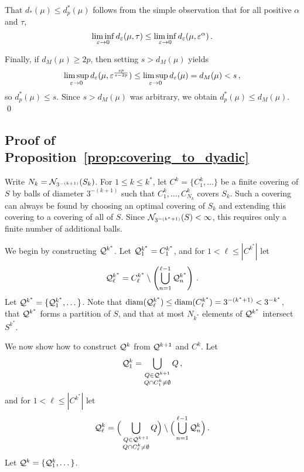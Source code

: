 That $d_*(\mu) \leq d^*_p(\mu)$ follows from the simple observation that for all positive $\alpha$ and $\tau$,
\begin{equation*}
\liminf_{\varepsilon \to 0} d_\varepsilon(\mu, \tau) \leq \liminf_{\varepsilon \to 0} d_\varepsilon(\mu, \varepsilon^{\alpha})\,.
\end{equation*}

Finally, if $d_M(\mu) \geq 2p$, then setting $s > d_M(\mu)$ yields
\begin{equation*}
\limsup_{\varepsilon \to 0} d_\varepsilon(\mu, \varepsilon^{\frac{sp}{s - 2p}}) \leq \limsup_{\varepsilon \to 0} d_\varepsilon(\mu) = d_M(\mu) < s\,,
\end{equation*}
so $d_p^*(\mu) \leq s$.
Since $s > d_M(\mu)$ was arbitrary, we obtain $d_p^*(\mu) \leq d_M(\mu)$.
\qed
\subsection{Proof of Proposition~\ref{prop:covering_to_dyadic}}
Write $N_k = \mathcal{N}_{3^{-(k+1)}}(S_k)$.
For $1 \leq k \leq k^*$, let $C^{k} = \{C^{k}_1, \dots\}$ be a finite covering of $S$ by balls of diameter $3^{-(k+1)}$ such that $C^{k}_1, \dots, C^{k}_{N_k}$ covers $S_k$.
Such a covering can always be found by choosing an optimal covering of $S_k$ and extending this covering to a covering of all of $S$.
Since $\mathcal{N}_{3^{-(k^* + 1)}}(S) < \infty$, this requires only a finite number of additional balls.

We begin by constructing $\mathcal{Q}^{k^*}$.
Let $\mathcal{Q}^{k^*}_1 = C^{k^*}_1$, and for $1 < \ell \leq |C^{k^*}|$ let
\begin{equation*}
\mathcal{Q}^{k^*}_\ell = C^{k^*}_\ell \setminus \left(\bigcup_{n = 1}^{\ell -1} \mathcal{Q}^{k^*}_n \right)\,.
\end{equation*}
Let $\mathcal{Q}^{k^*} = \{\mathcal{Q}^{k^*}_1, \dots \}$.
Note that $\operatorname{diam}(\mathcal{Q}^{k^*}_\ell) \leq \operatorname{diam}(C^{k^*}_\ell) = 3^{-(k^*+1)} < 3^{-k^*}$, that $\mathcal{Q}^{k^*}$ forms a partition of $S$, and that at most $N_{k^*}$ elements of $\mathcal{Q}^{k^*}$ intersect $S^{k^*}$.

We now show how to construct $\mathcal{Q}^{k}$ from $\mathcal{Q}^{k+1}$ and $C^k$.
Let
\begin{equation*}
\mathcal{Q}^k_1 = \bigcup_{\substack{Q \in \mathcal{Q}^{k+1} \\ Q \cap C^k_1 \neq \emptyset}} Q\,,
\end{equation*}
and for $1 < \ell \leq |C^{k^*}|$ let
\begin{equation*}
\mathcal{Q}^k_\ell = \Big(\bigcup_{\substack{Q \in \mathcal{Q}^{k+1} \\ Q \cap C^k_\ell \neq \emptyset}} Q\Big) \setminus \Big(\bigcup_{n = 1}^{\ell -1} \mathcal{Q}^{k}_n \Big)\,.
\end{equation*}
Let $\mathcal{Q}^{k} = \{\mathcal{Q}^{k}_1, \dots \}$.

